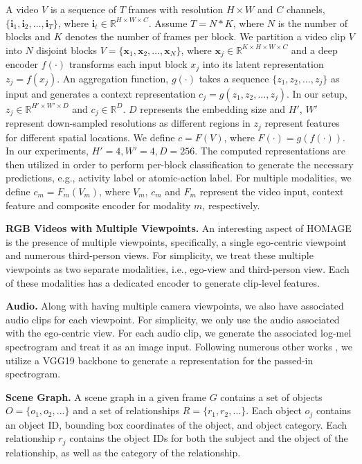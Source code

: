 \documentclass[final]{cvpr}
\begin{document}
A video $V$ is a sequence of $T$ frames with resolution $H \times W$ and $C$ channels, $\{\mathbf{i}_1, \mathbf{i}_2, \ldots, \mathbf{i}_{T}\}$, where $\mathbf{i}_t \in \mathbb{R}^{H \times W \times C}$. Assume $T = N * K$, where $N$ is the number of blocks and $K$ denotes the number of frames per block. We partition a video clip $V$ into $N$ disjoint blocks $V = \{\mathbf{x}_1, \mathbf{x}_2, \ldots, \mathbf{x}_{N}\}$, where $\mathbf{x}_j \in \mathbb{R}^{K \times H \times W \times C}$ and a deep encoder $f(\cdot)$ transforms each input block $x_j$ into its latent representation $z_j = f(x_j)$. An aggregation function, $g(\cdot)$ takes a sequence $\{z_1, z_2, \ldots, z_j\}$ as input and generates a context representation $c_j = g(z_1, z_2, \ldots, z_j)$. In our setup, $z_j \in \mathbb{R}^{H' \times W' \times D}$ and $c_j \in \mathbb{R}^{D}$. $D$ represents the embedding size and $H'$, $W'$ represent down-sampled resolutions as different regions in $z_j$ represent features for different spatial locations. We define $c = F(V)$, where $F(\cdot) = g(f(\cdot))$. In our experiments, $H'=4, W'=4, D=256$. The computed representations are then utilized in order to perform per-block classification to generate the necessary predictions, e.g., activity label or atomic-action label. For multiple modalities, we define $c_{m} = F_m(V_m)$, where $V_m$, $c_m$ and $F_m$ represent the video input, context feature and composite encoder for modality $m$, respectively.


\noindent\textbf{RGB Videos with Multiple Viewpoints.} An interesting aspect of HOMAGE is the presence of multiple viewpoints, specifically, a single ego-centric viewpoint and numerous third-person views. For simplicity, we treat these multiple viewpoints as two separate modalities, i.e., ego-view and third-person view. Each of these modalities has a dedicated encoder to generate clip-level features.

\noindent\textbf{Audio.} Along with having multiple camera viewpoints, we also have associated audio clips for each viewpoint. For simplicity, we only use the audio associated with the ego-centric view. For each audio clip, we generate the associated log-mel spectrogram \cite{logmel} and treat it as an image input. Following numerous other works \cite{afouras2020self, korbar2018cooperative}, we utilize a VGG19 backbone to generate a representation for the passed-in spectrogram.

\noindent\textbf{Scene Graph.} A scene graph in a given frame $G$ contains a set of objects $O = \{o_1, o_2, ...\}$ and a set of relationships $R = \{r_1, r_2, ...\}$. Each object $o_j$ contains an object ID, bounding box coordinates of the object, and object category. Each relationship $r_j$ contains the object IDs for both the subject and the object of the relationship, as well as the category of the relationship.
\end{document}
